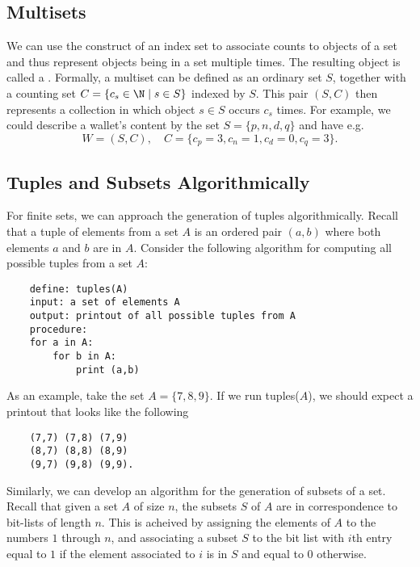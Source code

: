 \subsection{Multisets}
\label{secmultiset}

We can use the construct of an index set to associate counts to objects of a
set and thus represent objects being in a set multiple times. The resulting
object is called a . Formally, a multiset can be defined as
an ordinary set $S$, together with a counting set $C=\{c_s\in\N\mid s\in
S\}$ indexed by $S$. This pair $(S,C)$ then represents a collection in which
object $s\in S$ occurs  $c_s$ times. For example, we could describe a
wallet's content by the set $S=\{p,n,d,q\}$ 
and have e.g. 
\[
W=(S,C),\quad C=\{c_p=3,c_n=1,c_d=0,c_q=3\}.
\]

\subsection{Tuples and Subsets Algorithmically}

For finite sets, we can approach the generation of tuples algorithmically. Recall
that a tuple of elements from a set $A$ is an ordered pair $(a,b)$ where both elements
$a$ and $b$ are in $A$. Consider the following algorithm for computing all possible
tuples from a set $A$:
	\begin{verbatim}
	define: tuples(A)
	input: a set of elements A
	output: printout of all possible tuples from A
	procedure:
	for a in A:
	    for b in A:
	        print (a,b)
	\end{verbatim}
As an example, take the set $A=\{7,8,9\}$. If we run tuples($A$), we should expect
a printout that looks like the following
	\begin{verbatim}
	(7,7) (7,8) (7,9)
	(8,7) (8,8) (8,9)
	(9,7) (9,8) (9,9).
	\end{verbatim}

Similarly, we can develop an algorithm for the generation
of subsets of a set. Recall that given a set $A$ of size $n$, the subsets $S$
of $A$ are in correspondence to bit-lists of length $n$. This is acheived by
assigning the elements of $A$ to the numbers $1$ through $n$, and associating
a subset $S$ to the bit list with $i$th entry equal to $1$ if the element
associated to $i$ is in $S$ and equal to $0$ otherwise.
\smallskip

